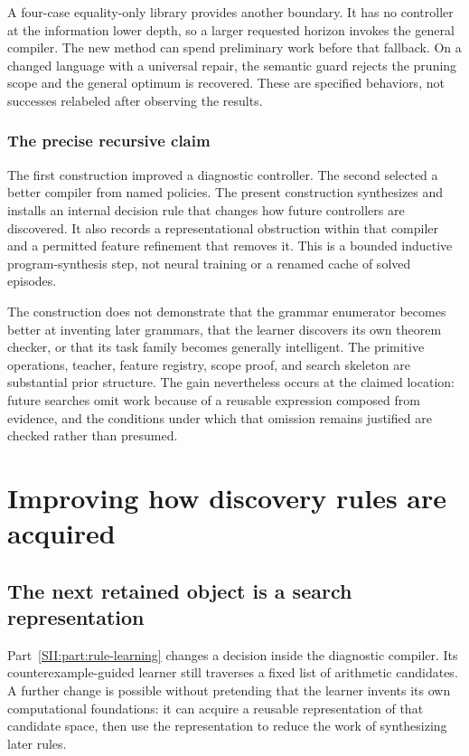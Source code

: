 A four-case equality-only library provides another boundary. It has no controller at the information lower depth, so a larger requested horizon invokes the general compiler. The new method can spend preliminary work before that fallback. On a changed language with a universal repair, the semantic guard rejects the pruning scope and the general optimum is recovered. These are specified behaviors, not successes relabeled after observing the results.



\subsection{The precise recursive claim}
The first construction improved a diagnostic controller. The second selected a better compiler from named policies. The present construction synthesizes and installs an internal decision rule that changes how future controllers are discovered. It also records a representational obstruction within that compiler and a permitted feature refinement that removes it. This is a bounded inductive program-synthesis step, not neural training or a renamed cache of solved episodes.

The construction does not demonstrate that the grammar enumerator becomes better at inventing later grammars, that the learner discovers its own theorem checker, or that its task family becomes generally intelligent. The primitive operations, teacher, feature registry, scope proof, and search skeleton are substantial prior structure. The gain nevertheless occurs at the claimed location: future searches omit work because of a reusable expression composed from evidence, and the conditions under which that omission remains justified are checked rather than presumed.



\chapter{Improving how discovery rules are acquired}\label{SII:book:chapter-63}
\label{SII:part:meta-acquisition}
\section{The next retained object is a search representation}\label{SII:sec:meta-acquisition}
Part~\ref{SII:part:rule-learning} changes a decision inside the diagnostic compiler. Its counterexample-guided learner still traverses a fixed list of arithmetic candidates. A further change is possible without pretending that the learner invents its own computational foundations: it can acquire a reusable representation of that candidate space, then use the representation to reduce the work of synthesizing later rules.

